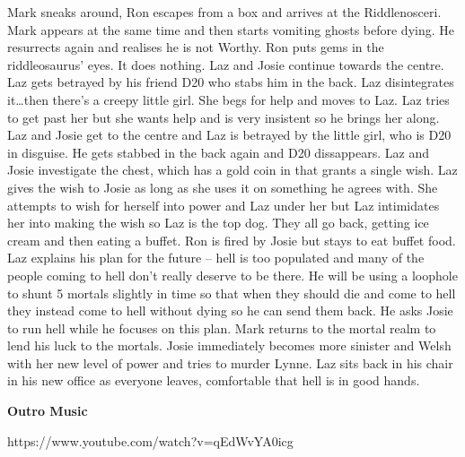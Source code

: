 Mark sneaks around, Ron escapes from a box and arrives at the Riddlenosceri. Mark appears at the same time and then starts vomiting ghosts before dying. He resurrects again and realises he is not Worthy. Ron puts gems in the riddleosaurus’ eyes. It does nothing. Laz and Josie continue towards the centre. Laz gets betrayed by his friend D20 who stabs him in the back. Laz disintegrates it…then there’s a creepy little girl. She begs for help and moves to Laz. Laz tries to get past her but she wants help and is very insistent so he brings her along. Laz and Josie get to the centre and Laz is betrayed by the little girl, who is D20 in disguise. He gets stabbed in the back again and D20 dissappears. Laz and Josie investigate the chest, which has a gold coin in that grants a single wish. Laz gives the wish to Josie as long as she uses it on something he agrees with. She attempts to wish for herself into power and Laz under her but Laz intimidates her into making the wish so Laz is the top dog. They all go back, getting ice cream and then eating a buffet. Ron is fired by Josie but stays to eat buffet food. Laz explains his plan for the future – hell is too populated and many of the people coming to hell don’t really deserve to be there. He will be using a loophole to shunt 5 mortals slightly in time so that when they should die and come to hell they instead come to hell without dying so he can send them back. He asks Josie to run hell while he focuses on this plan. Mark returns to the mortal realm to lend his luck to the mortals. Josie immediately becomes more sinister and Welsh with her new level of power and tries to murder Lynne. Laz sits back in his chair in his new office as everyone leaves, comfortable that hell is in good hands.\medskip

\textbf{Outro Music}\medskip

https://www.youtube.com/watch?v=qEdWvYA0icg\medskip



%

\clearpage